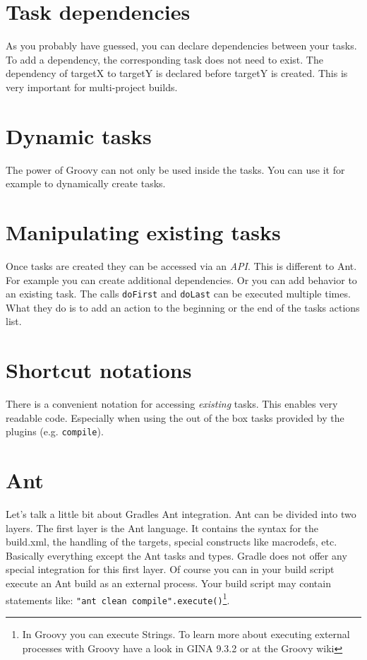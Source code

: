 \section{Task dependencies}
As you probably have guessed, you can declare dependencies between your tasks.
To add a dependency, the corresponding task does not need to exist. 
The dependency of targetX to targetY is declared before targetY is created. This is very important for multi-project builds.

\section{Dynamic tasks}
The power of Groovy can not only be used inside the tasks. You can use it for example to dynamically create tasks.

\section{Manipulating existing tasks}
Once tasks are created they can be accessed via an \emph{API}. This is different to Ant. For example you can create additional dependencies.
Or you can add behavior to an existing task.
The calls \texttt{doFirst} and \texttt{doLast} can be executed multiple times. What they do is to add an action to the beginning or the end of the tasks actions list.

\section{Shortcut notations}
There is a convenient notation for accessing \emph{existing} tasks.
This enables very readable code. Especially when using the out of the box tasks provided by the plugins (e.g. \texttt{compile}).

\section{Ant}
Let's talk a little bit about Gradles Ant integration. Ant can be divided into two layers. The first layer is the Ant language. It contains the syntax for the build.xml, the handling of the targets, special constructs like macrodefs, etc. Basically everything except the Ant tasks and types. Gradle does not offer any special integration for this first layer. Of course you can in your build script execute an Ant build as an external process. Your build script may contain statements like: \texttt{"ant clean compile".execute()}\footnote{In Groovy you can execute Strings. To learn more about executing external processes with Groovy have a look in GINA 9.3.2 or at the Groovy wiki}.

